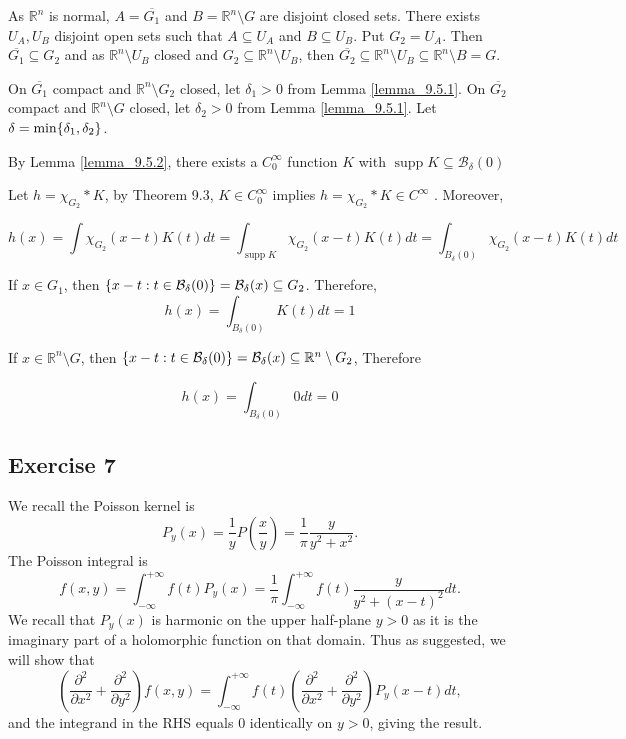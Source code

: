 \documentclass{article}
\DeclareMathOperator{\supp}{supp}
\DeclarePairedDelimiter{\set}{\{}{\}}
\newcommand\Ball{\mathcal{B}}
\newcommand\R{\mathbb{R}}
\begin{document}
As $\R^n$ is normal, $A = \overline{G_1}$ and $B = \R^n \setminus G$ are disjoint closed sets. There exists $U_A, U_B$ disjoint open sets such that $A \subseteq U_A$ and $B \subseteq U_B$. Put $G_2 = U_A$. Then $\overline{G_1} \subseteq G_2$ and as $\R^n \setminus U_B$ closed and $G_2 \subseteq \R^n \setminus U_B$, then $\overline{G_2} \subseteq \R^n \setminus U_B \subseteq \R^n \setminus B = G$.

On $\overline{G_1}$ compact and $\R^n \setminus G_2$ closed, let $\delta_1 > 0$ from Lemma \ref{lemma_9.5.1}. On $\overline{G_2}$ compact and $\R^n \setminus G$ closed, let $\delta_2 > 0$ from Lemma \ref{lemma_9.5.1}. Let $\delta = \min \set{\delta_1, \delta_2}$.

By Lemma \ref{lemma_9.5.2}, there exists a $C_0^\infty$ function $K$ with $\supp K \subseteq \Ball_\delta(0)$

Let $h = \chi_{G_2} * K$, by Theorem 9.3, $K \in C_0^\infty$ implies $h = \chi_{G_2} * K \in C^\infty$ . Moreover,

\[
    h(x) = \int \chi_{G_2}(x-t) K(t) dt = \int_{\supp K} \chi_{G_2}(x-t) K(t) dt = \int_{B_\delta(0)} \chi_{G_2}(x-t) K(t) dt
\]

If $x \in G_1$, then $\set{ x - t: t \in \Ball_\delta(0) } = \Ball_\delta(x) \subseteq G_2$. Therefore,
\[
    h(x) = \int_{B_\delta(0)} K(t) dt = 1
\]

If $x \in \R^n \setminus G$, then $\set{ x - t: t \in \Ball_\delta(0)} = \Ball_\delta(x) \subseteq \R^n \setminus G_2$, Therefore

\[
    h(x) = \int_{B_\delta(0)} 0 dt = 0
\]


\subsection{Exercise 7} %
We recall the Poisson kernel is 
\begin{equation*}
	P_{y}(x) = \frac{1}{y} P \left( \frac{x}{y} \right) = \frac{1}{\pi}\frac{y}{y^{2} + x^{2}}.
\end{equation*}
The Poisson integral is 
\begin{equation*}
	f(x, y) = \int_{-\infty}^{+\infty} f(t) P_{y}(x) = \frac{1}{\pi} \int_{-\infty}^{+\infty} f(t) \frac{y}{y^{2} + (x - t)^{2}} dt.
\end{equation*}
We recall that $P_{y}(x)$ is harmonic on the upper half-plane $y > 0$ as it is the imaginary part of a holomorphic function on that domain. Thus as suggested, we will show that 
\begin{equation*}
	\left(\frac{\partial^{2}}{\partial x^{2}} + \frac{\partial^{2}}{\partial y^{2}}\right) f(x, y) = \int_{-\infty}^{+\infty} f(t) \left(\frac{\partial^{2}}{\partial x^{2}} + \frac{\partial^{2}}{\partial y^{2}}\right) P_{y}(x - t) dt, 
\end{equation*}
and the integrand in the RHS equals $0$ identically on $y > 0$, giving the result.
\end{document}
